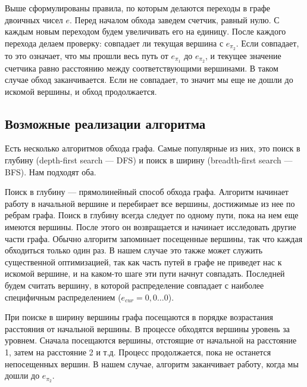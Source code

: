 \documentclass[a4paper, 14pt]{extarticle}
\begin{document}
Выше сформулированы правила, по которым делаются переходы в графе двоичных чисел $e$. Перед началом обхода заведем счетчик, равный нулю. С каждым новым переходом будем увеличивать его на единицу. После каждого перехода делаем проверку: совпадает ли текущая вершина с $e_{\pi_2}$. Если совпадает, то это означает, что мы прошли весь путь от $e_{\pi_1}$ до $e_{\pi_2}$, и текущее значение счетчика равно расстоянию между соответствующими вершинами. В таком случае обход заканчивается. Если не совпадает, то значит мы еще не дошли до искомой вершины, и обход продолжается.

\subsection{Возможные реализации алгоритма}
Есть несколько алгоритмов обхода графа. Самые популярные из них, это поиск в глубину (depth-first search --- DFS) и поиск в ширину (breadth-first search --- BFS). Нам подходят оба.

Поиск в глубину --- прямолинейный способ обхода графа. Алгоритм начинает работу в начальной вершине и перебирает все вершины, достижимые из нее по ребрам графа. Поиск в глубину всегда следует по одному пути, пока на нем еще имеются вершины. После этого он возвращается и начинает исследовать другие части графа. Обычно алгоритм запоминает посещенные вершины, так что каждая обходиться только один раз. В нашем случае это также может служить существенной оптимизацией, так как часть путей в графе не приведет нас к искомой вершине, и на каком-то шаге эти пути начнут совпадать. Последней будем считать вершину, в которой распределение совпадает с наиболее специфичным распределением ($e_{cur}=0,0\ldots0$). 

При поиске в ширину вершины графа посещаются в порядке возрастания расстояния от начальной вершины. В процессе обходятся вершины уровень за уровнем. Сначала посещаются вершины, отстоящие от начальной на расстояние 1, затем на расстояние 2 и т.д. Процесс продолжается, пока не останется непосещенных вершин. В нашем случае, алгоритм заканчивает работу, когда мы дошли до $e_{\pi_2}$.
\end{document}
